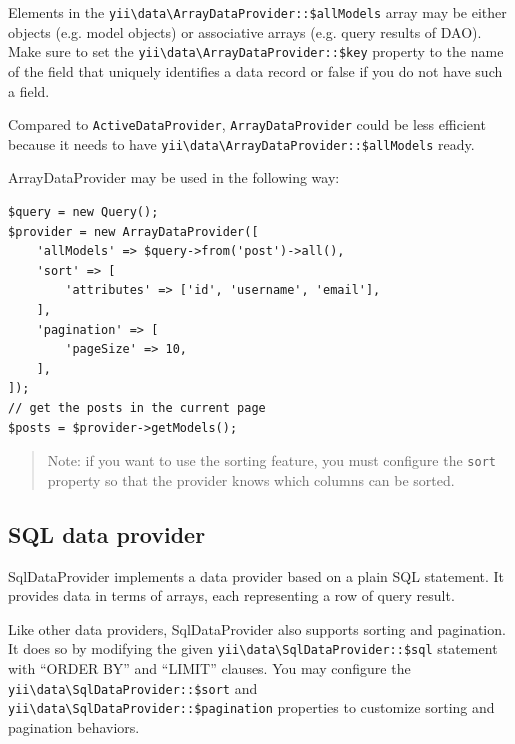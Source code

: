 Elements in the \texttt{yii{\allowbreak{}\textbackslash}data{\allowbreak{}\textbackslash}ArrayDataProvider\allowbreak{}::\allowbreak{}\$allModels} array may be either objects (e.g. model objects)
or associative arrays (e.g. query results of DAO).
Make sure to set the \texttt{yii{\allowbreak{}\textbackslash}data{\allowbreak{}\textbackslash}ArrayDataProvider\allowbreak{}::\allowbreak{}\$key} property to the name of the field that uniquely
identifies a data record or false if you do not have such a field.

Compared to \lstinline|ActiveDataProvider|, \lstinline|ArrayDataProvider| could be less efficient
because it needs to have \texttt{yii{\allowbreak{}\textbackslash}data{\allowbreak{}\textbackslash}ArrayDataProvider\allowbreak{}::\allowbreak{}\$allModels} ready.

ArrayDataProvider may be used in the following way:

\lstset{language=php}\begin{lstlisting}
$query = new Query();
$provider = new ArrayDataProvider([
    'allModels' => $query->from('post')->all(),
    'sort' => [
        'attributes' => ['id', 'username', 'email'],
    ],
    'pagination' => [
        'pageSize' => 10,
    ],
]);
// get the posts in the current page
$posts = $provider->getModels();
\end{lstlisting}
\begin{quote}Note: if you want to use the sorting feature, you must configure the \texttt{sort} property
so that the provider knows which columns can be sorted.

\end{quote}
\subsection{SQL data provider}
SqlDataProvider implements a data provider based on a plain SQL statement. It provides data in terms of arrays, each
representing a row of query result.

Like other data providers, SqlDataProvider also supports sorting and pagination. It does so by modifying the given
\texttt{yii{\allowbreak{}\textbackslash}data{\allowbreak{}\textbackslash}SqlDataProvider\allowbreak{}::\allowbreak{}\$sql} statement with ``ORDER BY'' and ``LIMIT'' clauses. You may configure the
\texttt{yii{\allowbreak{}\textbackslash}data{\allowbreak{}\textbackslash}SqlDataProvider\allowbreak{}::\allowbreak{}\$sort} and \texttt{yii{\allowbreak{}\textbackslash}data{\allowbreak{}\textbackslash}SqlDataProvider\allowbreak{}::\allowbreak{}\$pagination} properties to customize sorting
and pagination behaviors.

